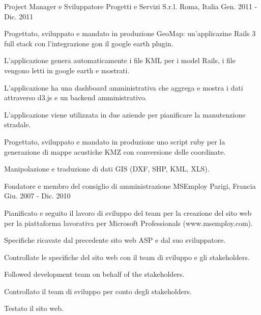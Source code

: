 \begin{cventries}
  \cventry
    {Project Manager e Sviluppatore} %
    {Progetti e Servizi S.r.l.} %
    {Roma, Italia} %
    {Gen. 2011 - Dic. 2011} %
    {
      \begin{cvitems} %
        \item {Progettato, sviluppato e mandato in produzione GeoMap: un'applicazine Rails 3 full stack con l'integrazione gon il google earth plugin.}
        \item {L'applicazione genera automaticamente i file KML per i model Rails, i file vengono letti in google earth e mostrati.}
        \item {L'applicazione ha una dashboard amministrativa che aggrega e mostra i dati attraverso d3.js e un backend amministrativo.}
        \item {L'applicazione viene utilizzata in due aziende per pianificare la manutenzione stradale.}
        \item {Progettato, sviluppato e mandato in produzione uno script ruby per la generazione di mappe acustiche KMZ con conversione delle coordinate.}
        \item {Manipolazione e traduzione di dati GIS (DXF, SHP, KML, XLS).}
      \end{cvitems}
    }

  \cventry
    {Fondatore e membro del consiglio di amministrazione} %
    {MSEmploy} %
    {Parigi, Francia} %
    {Giu. 2007 - Dic. 2010} %
    {
      \begin{cvitems} %
        \item {Pianificato e seguito il lavoro di sviluppo del team per la creazione del sito web per la piattaforma lavorativa per Microsoft Professionals (www.msemploy.com).}
        \item {Specifiche ricavate dal precedente sito web ASP e dal suo sviluppatore.}
        \item {Controllate le specifiche del sito web con il team di sviluppo e gli stakeholders.}
        \item {Followed development team on behalf of the stakeholders.}
        \item {Controllato il team di sviluppo per conto degli stakeholders.}
        \item {Testato il sito web.}
      \end{cvitems}
    }


\end{cventries}
